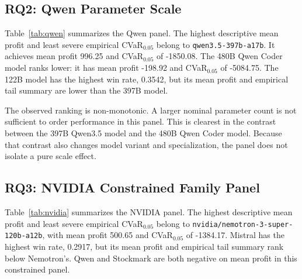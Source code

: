 \documentclass[11pt]{article}
\begin{document}
\subsection{RQ2: Qwen Parameter Scale}
Table~\ref{tab:qwen} summarizes the Qwen panel. The highest descriptive mean profit and least severe empirical CVaR$_{0.05}$ belong to \texttt{qwen3.5-397b-a17b}. It achieves mean profit 996.25 and CVaR$_{0.05}$ of -1850.08. The 480B Qwen Coder model ranks lower: it has mean profit -198.92 and CVaR$_{0.05}$ of -5084.75. The 122B model has the highest win rate, 0.3542, but its mean profit and empirical tail summary are lower than the 397B model.

\begin{table}[t]
    \centering
    \caption{Qwen parameter-scale panel. Each model has 48 session samples. The CVaR low-support flag is false for all rows, but the effective 5\% tail mass is 2.4 sessions, so CVaR is descriptive.}
    \label{tab:qwen}
\end{table}

The observed ranking is non-monotonic. A larger nominal parameter count is not sufficient to order performance in this panel. This is clearest in the contrast between the 397B Qwen3.5 model and the 480B Qwen Coder model. Because that contrast also changes model variant and specialization, the panel does not isolate a pure scale effect.

\subsection{RQ3: NVIDIA Constrained Family Panel}
Table~\ref{tab:nvidia} summarizes the NVIDIA panel. The highest descriptive mean profit and least severe empirical CVaR$_{0.05}$ belong to \texttt{nvidia/nemotron-3-super-120b-a12b}, with mean profit 500.65 and CVaR$_{0.05}$ of -1384.17. Mistral has the highest win rate, 0.2917, but its mean profit and empirical tail summary rank below Nemotron's. Qwen and Stockmark are both negative on mean profit in this constrained panel.
\end{document}
